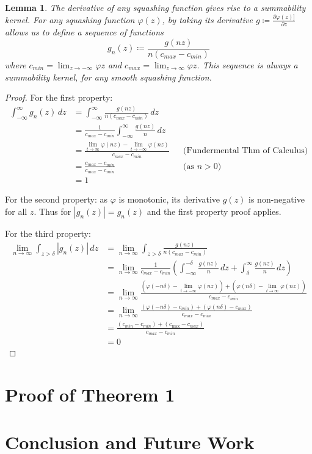 \documentclass{article} %
\newtheorem{lem}[thm]{Lemma}
\newcommand{\dlim}{\displaystyle\lim}
\begin{document}
\begin{lem}{The derivative of any squashing function gives rise to a summability kernel.}
	For any squashing function $\varphi(z)$,
	by taking its derivative $g \coloneqq \frac{\partial\varphi(z)]}{\partial z}$ allows us to define a sequence of functions 
	\begin{equation}
	g_n(z) \coloneqq \frac{g(nz)}{n\left( c_{max} - c_{min} \right)} 
	\end{equation}
	 where $c_{min}=\lim_{z \to -\infty} \varphi{z}$ and $c_{max}=\lim_{z \to \infty} \varphi{z}$.
	This sequence is always a summability kernel, for any smooth squashing function.
	
\end{lem}
\begin{proof}
For the first property:
\begin{align}
	\int_{-\infty}^{\infty} g_n(z) \, dz &=  \int_{-\infty}^{\infty} \frac{g(nz)}{n\left( c_{max} - c_{min} \right)} \, dz \\
	&= \frac{1}{c_{max} - c_{min}} \int_{-\infty}^{\infty} \frac{g(nz)}{n} \, dz \\
	&= \frac{\dlim_{t \to \infty} \varphi(nz) - \dlim_{t \to -\infty} \varphi(nz)}{c_{max} - c_{min}} && \text{(Fundermental Thm of Calculus)}\\
	&= \frac{c_{max} - c_{min}}{c_{max} - c_{min}}  && \text{(as $n>0$)}\\
	&= 1	
\end{align}
	
For the second property: as  $\varphi$ is monotonic, its derivative $g(z)$ is non-negative for all $z$. Thus for $|g_n(z)|=g_n(z)$ and the first property proof applies.

For the third property:
\begin{align}
	\lim_{n\to\infty} \int_{z>\delta} |g_n(z)|\, dz &= \lim_{n\to\infty} \int_{z>\delta} \frac{g(nz)}{n\left( c_{max} - c_{min} \right)} \\
	 &= \lim_{n\to\infty} \frac{1}{c_{max} - c_{min}} 
		 \left( \int_{-\infty}^{-\delta} \frac{g(nz)}{n} \, dz 
		 + \int_\delta^\infty \frac{g(nz)}{n} \, dz \right) \\
	 &= \lim_{n\to\infty} \frac{
	 	\left(\varphi(-n\delta)-\dlim_{t \to -\infty} \varphi(nz)\right)
	 	 + \left( \varphi(n\delta) - \dlim_{t \to \infty} \varphi(nz)\right)}%
	 	 {c_{max} - c_{min}} \\
	 &= \lim_{n\to\infty} \frac{
	 	\left(\varphi(-n\delta)-c_{min} \right)
	 	+ \left( \varphi(n\delta) - c_{max} \right)}%
	    {c_{max} - c_{min}} \\
	 &= \frac{
	 	\left(c_{min}-c_{min} \right)
	 	+ \left(c_{\max} - c_{max} \right)}%
		{c_{max} - c_{min}} \\
	 &= 0
\end{align}


\end{proof}


\section{Proof of Theorem 1}

\section{Conclusion and Future Work}



\end{document}
